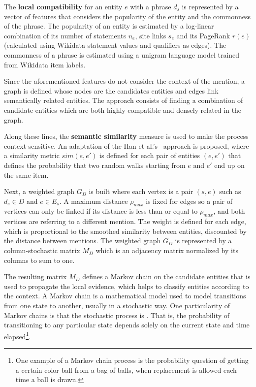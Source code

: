 The \textbf{local compatibility} for an entity $e$ with a phrase $d_s$ is represented by a 
vector of features that considers the popularity of the entity and the commonness of the 
phrase. The popularity of an entity is estimated by a log-linear combination of its number of 
statements $n_e$, site links $s_e$ and its PageRank $r(e)$ (calculated using Wikidata 
statement values and qualifiers as edges). The commonness of a phrase is estimated using a 
unigram language model trained from Wikidata item labels.

Since the aforementioned features do not consider the context of the mention, a graph is defined 
whose nodes are the candidates entities and edges link semantically related entities. The 
approach consists of finding a combination of candidate entities which are both highly 
compatible and densely related in the graph.

Along these lines, the \textbf{semantic similarity} measure is used to make the process 
context-sensitive. An adaptation of the Han et al.'s~\cite{infExtr:HanSZ11} approach is 
proposed, where a similarity metric $sim(e,e')$ is defined for each pair of entities $(e,e')$ 
that defines the probability that two random walks starting from $e$ and $e'$ end up on the 
same item.

Next, a weighted graph $G_D$ is built where each vertex is a pair $(s,e)$ such as $d_s \in D$ 
and $e \in E_s$. A maximum distance $\rho_{max}$ is fixed for edges so a pair of vertices can 
only be linked if its distance is less than or equal to $\rho_{max}$, and both vertices are 
referring to a different mention. The weight is defined for each edge, which is proportional to
the smoothed similarity between entities, discounted by the distance between mentions. The 
weighted graph $G_D$ is represented by a column-stochastic matrix $M_D$ which is an adjacency 
matrix normalized by its columns to sum to one.

The resulting matrix $M_D$ defines a Markov chain on the candidate entities that is used to
propagate the local evidence, which helps to classify entities according to the context. A 
Markov chain is a mathematical model used to model transitions from one state to another, 
usually in a stochastic way. One particularity of Markov chains is that the stochastic 
process is . That is, the probability of transitioning to any particular state 
depends solely on the current state and time elapsed\footnote{One example of a Markov chain 
process is the probability question of getting a certain color ball from a bag of balls, when 
replacement is allowed each time a ball is drawn.}.

